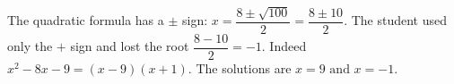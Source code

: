 The quadratic formula has a $\pm$ sign: $x=\dfrac{8\pm\sqrt{100}}{2}=\dfrac{8\pm10}{2}$. The student used only the $+$ sign and lost the root $\dfrac{8-10}{2}=-1$. Indeed $x^2-8x-9=(x-9)(x+1)$. The solutions are $\boxed{x=9\text{ and }x=-1}$.
